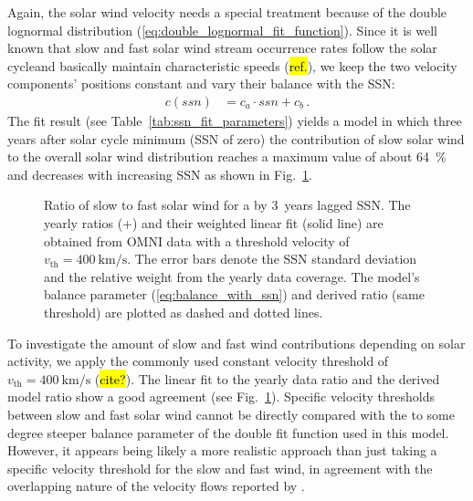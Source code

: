 Again, the solar wind velocity needs a special treatment because of the double lognormal distribution (\ref{eq:double_lognormal_fit_function}). Since it is well known that slow and fast solar wind stream occurrence rates follow the solar cycleand basically maintain characteristic speeds (\hl{ref.}), we keep the two velocity components' positions constant and vary their balance with the SSN:
\begin{align}
	c(ssn) &= c_a \cdot ssn + c_b\,.	\label{eq:balance_with_ssn}
\end{align}
The fit result (see Table~\ref{tab:ssn_fit_parameters}) yields a model in which three years after solar cycle minimum (SSN of zero) the contribution of slow solar wind to the overall solar wind distribution reaches a maximum value of about \SI{64}{\percent} and decreases with increasing SSN as shown in Fig.~\ref{fig:Vdbl_SSN_ratio_f_plot}.
\begin{figure}
	\caption{Ratio of slow to fast solar wind for a by 3~years lagged SSN. The yearly ratios (+) and their weighted linear fit (solid line) are obtained from OMNI data with a threshold velocity of $v_\text{th} = \SI{400}{\km\per\s}$. The error bars denote the SSN standard deviation and the relative weight from the yearly data coverage. The model's balance parameter (\ref{eq:balance_with_ssn}) and derived ratio (same threshold) are plotted as dashed and dotted lines.}
	\label{fig:Vdbl_SSN_ratio_f_plot}
\end{figure}

To investigate the amount of slow and fast wind contributions depending on solar activity, we apply the commonly used constant velocity threshold of $v_\text{th} = \SI{400}{\km\per\s}$ (\hl{cite?}). The linear fit to the yearly data ratio and the derived model ratio show a good agreement (see Fig.~\ref{fig:Vdbl_SSN_ratio_f_plot}). Specific velocity thresholds between slow and fast solar wind cannot be directly compared with the to some degree steeper balance parameter of the double fit function used in this model. However, it appears being likely a more realistic approach than just taking a specific velocity threshold for the slow and fast wind, in agreement with the overlapping nature of the velocity flows reported by \citep{McGregor2011b}.


